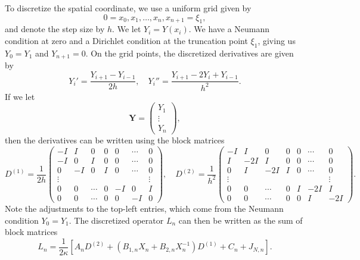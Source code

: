 \documentclass[11pt]{article}
\begin{document}
To discretize the spatial coordinate, we use a uniform grid given by
\begin{equation*}
  0 = x_{0}, x_{1}, \dots, x_{n}, x_{n + 1} = \xi_{1},
\end{equation*}
and denote the step size by \(h\). We let \(Y_{i} = Y(x_{i})\). We
have a Neumann condition at zero and a Dirichlet condition at the
truncation point \(\xi_{1}\), giving us \(Y_{0} = Y_{1}\) and
\(Y_{n + 1} = 0\). On the grid points, the discretized derivatives are
given by
\begin{equation*}
  Y_{i}' = \frac{Y_{i + 1} - Y_{i - 1}}{2h},\quad
  Y_{i}'' = \frac{Y_{i + 1} - 2Y_{i} + Y_{i - 1}}{h^{2}}.
\end{equation*}
If we let
\begin{equation*}
  \bm{Y} =
  \begin{pmatrix}
    Y_{1} \\ \vdots \\ Y_{n}
  \end{pmatrix},
\end{equation*}
then the derivatives can be written using the block matrices
\begin{equation*}
  D^{(1)} =
  \frac{1}{2h}\begin{pmatrix}
    -I & I & 0 & 0 & 0 & \cdots & 0\\
    -I & 0 & I & 0 & 0 & \cdots & 0\\
    0 & -I & 0 & I & 0 & \cdots & 0\\
    \vdots & & & & & & \vdots \\
    0 & 0 & \cdots & 0 & -I & 0 & I\\
    0 & 0 & \cdots & 0 & 0 & -I & 0
  \end{pmatrix},\quad
  D^{(2)} =
  \frac{1}{h^{2}}\begin{pmatrix}
    -I & I & 0 & 0 & 0 & \cdots & 0\\
    I & -2I & I & 0 & 0 & \cdots & 0\\
    0 & I & -2I & I & 0 & \cdots & 0\\
    \vdots & & & & & & \vdots \\
    0 & 0 & \cdots & 0 & I & -2I & I\\
    0 & 0 & \cdots & 0 & 0 & I & -2I
  \end{pmatrix}.
\end{equation*}
Note the adjustments to the top-left entries, which come from the
Neumann condition \(Y_{0} = Y_{1}\). The discretized operator
\(L_{n}\) can then be written as the sum of block matrices
\begin{equation*}
  L_{n} = \frac{1}{2\kappa}\left[A_{n}D^{(2)} + (B_{1,n}X_{n} + B_{2,n}X_{n}^{-1})D^{(1)} + C_{n} + J_{N,n}\right].
\end{equation*}
\end{document}
